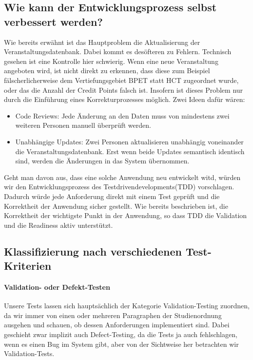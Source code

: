 \documentclass[ngerman]{article}
\begin{document}
\subsection{Wie kann der Entwicklungsprozess selbst verbessert werden?}

Wie bereits erwähnt ist das Hauptproblem die Aktualisierung der Veranstaltungsdatenbank.
Dabei kommt es desöfteren zu Fehlern.
Technisch gesehen ist eine Kontrolle hier schwierig.
Wenn eine neue Veranstaltung angeboten wird, ist nicht direkt zu erkennen, dass diese zum Beispiel fälscherlicherweise dem Vertiefungsgebiet BPET statt HCT zugeordnet wurde, oder das die Anzahl der Credit Points falsch ist.
Insofern ist dieses Problem nur durch die Einführung eines Korrekturprozesses möglich.
Zwei Ideen dafür wären:

\begin{itemize}
    \item Code Reviews: Jede Änderung an den Daten muss von mindestens zwei weiteren Personen manuell überprüft werden.
    \item Unabhängige Updates: Zwei Personen aktualisieren unabhängig voneinander die Veranstaltungsdatenbank. Erst wenn beide Updates semantisch identisch sind, werden die Änderungen in das System übernommen.
\end{itemize}

Geht man davon aus, dass eine solche Anwendung neu entwickelt witd, würden wir den Entwicklungsprozess des Testdrivendevelopments(TDD) vorschlagen. 
Dadurch würde jede Anforderung direkt mit einem Test geprüft und die Korrektheit der Anwendung sicher gestellt. Wie bereits beschrieben ist, die Korrektheit der wichtigste Punkt in der Anwendung, so dass TDD die Validation und die Readiness aktiv unterstützt.

\subsection{Klassifizierung nach verschiedenen Test-Kriterien}

\paragraph{Validation- oder Defekt-Testen}
Unsere Tests lassen sich hauptsächlich der Kategorie Validation-Testing zuordnen, da wir immer von einen oder mehreren Paragraphen der Studienordnung ausgehen und schauen, ob dessen Anforderungen implementiert sind.
Dabei geschieht zwar implizit auch Defect-Testing, da die Tests ja auch fehlschlagen, wenn es einen Bug im System gibt, aber von der Sichtweise her betrachten wir Validation-Tests.
\end{document}
